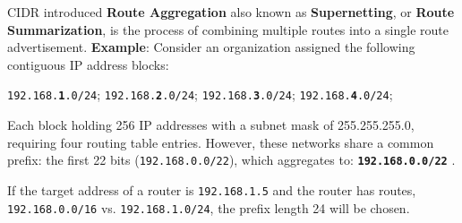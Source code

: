 \begin{Def}

    CIDR introduced \textbf{Route Aggregation} also known as \textbf{Supernetting}, or \textbf{Route Summarization}, is the process of combining multiple routes into a single route advertisement.
    \textbf{Example}:
    Consider an organization assigned the following contiguous IP address blocks:
    \begin{center}
        \texttt{192.168.\textbf{1}.0/24}; \quad \texttt{192.168.\textbf{2}.0/24}; \quad \texttt{192.168.\textbf{3}.0/24}; \quad \texttt{192.168.\textbf{4}.0/24};
    \end{center}
    Each block holding 256 IP addresses with a subnet mask of 255.255.255.0, requiring four routing table entries. 
    However, these networks share a common prefix: the first 22 bits (\texttt{192.168.0.0/22}), which aggregates to: \texttt{\textbf{192.168.0.0/22}} \cite{fuller_cidr_rfc1519}.

\end{Def}
\begin{theo}

    If the target address of a router is \texttt{192.168.1.5}
    and the router has routes, \texttt{192.168.0.0/16} vs. \texttt{192.168.1.0/24}, the prefix length 24 will be chosen.
\end{theo}
\newpage

